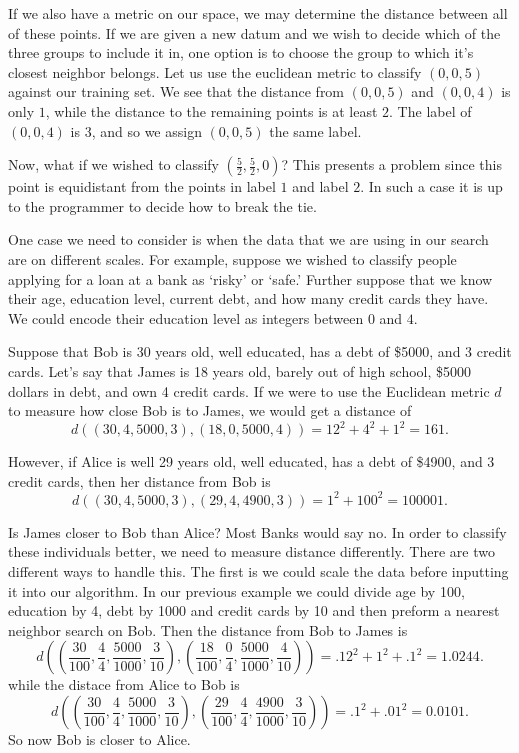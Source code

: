 If we also have a metric on our space, we may determine the distance between all of these points.  If we are given a new datum and we wish to decide which of the three groups to include it in, one option is to choose the group to which it's closest neighbor belongs.  Let us use the euclidean metric to classify $(0,0,5)$ against our training set.  We see that the distance from $(0,0,5)$ and $(0,0,4)$ is only $1$, while the distance to the remaining points is at least $2$.  The label of $(0,0,4)$ is $3$, and so we assign $(0,0,5)$ the same label.

Now, what if we wished to classify $(\frac{5}{2},\frac{5}{2},0)$?  This presents a problem since this point is equidistant from the points in label $1$ and label $2$.  In such a case it is up to the programmer to decide how to break the tie.

One case we need to consider is when the data that we are using in our search are on different scales. For example, suppose we wished to classify people applying for a loan at a bank as `risky' or `safe.'  Further suppose that we know their age, education level, current debt, and how many credit cards they have.  We could encode their education level as integers between $0$ and $4$.

Suppose that Bob is 30 years old, well educated, has a debt of \$5000, and 3 credit cards.  Let's say that James is 18 years old, barely out of high school, \$5000 dollars in debt, and own 4 credit cards.  If we were to use the Euclidean metric $d$ to measure how close Bob is to James, we would get a distance of
\[
d((30,4,5000,3),(18,0,5000,4)) = 12^2 + 4^2 + 1^2 = 161.
\]

However, if Alice is well 29 years old, well educated, has a debt of \$4900, and 3 credit cards, then her distance from Bob is
\[
d((30,4,5000,3),(29,4,4900,3)) = 1^2 + 100^2 = 100001.
\]

Is James closer to Bob than Alice?  Most Banks would say no.  In order to classify these individuals better, we need to measure distance differently. There are two different ways to handle this. The first is we could scale the data before inputting it into our algorithm. In our previous example we could divide age by 100, education by 4, debt by 1000 and credit cards by 10 and then preform a nearest neighbor search on Bob. Then the distance from Bob to James is 
\[
d((\frac{30}{100},\frac{4}{4},\frac{5000}{1000},\frac{3}{10}),(\frac{18}{100},\frac{0}{4},\frac{5000}{1000},\frac{4}{10})) = .12^2 + 1^2 + .1^2 = 1.0244.
\]
while the distace from Alice to Bob is
\[
d((\frac{30}{100},\frac{4}{4},\frac{5000}{1000},\frac{3}{10}),(\frac{29}{100},\frac{4}{4},\frac{4900}{1000},\frac{3}{10})) = .1^2 + .01^2 = 0.0101.
\]
So now Bob is closer to Alice.

